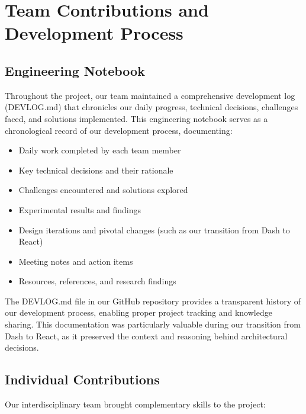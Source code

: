 \documentclass[12pt]{article}
\begin{document}
\section{Team Contributions and Development Process}

\subsection{Engineering Notebook}

Throughout the project, our team maintained a comprehensive development log (DEVLOG.md) that chronicles our daily progress, technical decisions, challenges faced, and solutions implemented. This engineering notebook serves as a chronological record of our development process, documenting:

\begin{itemize}
    \item Daily work completed by each team member
    \item Key technical decisions and their rationale
    \item Challenges encountered and solutions explored
    \item Experimental results and findings
    \item Design iterations and pivotal changes (such as our transition from Dash to React)
    \item Meeting notes and action items
    \item Resources, references, and research findings
\end{itemize}

The DEVLOG.md file in our GitHub repository provides a transparent history of our development process, enabling proper project tracking and knowledge sharing. This documentation was particularly valuable during our transition from Dash to React, as it preserved the context and reasoning behind architectural decisions.

\subsection{Individual Contributions}

Our interdisciplinary team brought complementary skills to the project:
\end{document}
